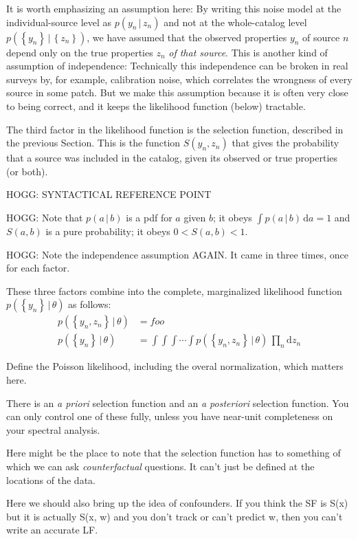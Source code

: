 \documentclass[modern]{aastex62}
\newcommand{\dd}{\mathrm{d}}
\newcommand{\given}{\,|\,}
\newcommand{\set}[1]{\left\{{#1}\right\}}
\newcommand{\sectionname}{Section}
\newcommand{\foreign}[1]{\textsl{#1}}
\begin{document}
It is worth emphasizing an assumption here:
By writing this noise model at the individual-source level as
$p(y_n\given z_n)$
and not at the whole-catalog level
$p(\set{y_n}\given\set{z_n})$,
we have assumed that the observed properties $y_n$ of source $n$
depend only on the true properties $z_n$ \emph{of that source}.
This is another kind of assumption of independence:
Technically this independence can be broken in real surveys by,
for example, calibration noise, which correlates the wrongness of
every source in some patch.
But we make this assumption because it is often very close to being
correct, and it keeps the likelihood function (below) tractable.

The third factor in the likelihood function is the selection function,
described in the previous \sectionname.
This is the function $S(y_n,z_n)$ that gives the probability that a source was included in the
catalog, given its observed or true properties (or both).

HOGG: SYNTACTICAL REFERENCE POINT

HOGG: Note that $p(a\given b)$ is a pdf for $a$ given $b$; it obeys
$\int p(a\given b)\,\dd a = 1$ and $S(a,b)$ is a pure probability; it
obeys $0<S(a, b)<1$.

HOGG: Note the independence assumption AGAIN. It came in three times, once
for each factor.

These three factors combine into the complete, marginalized likelihood
function $p(\set{y_n}\given\theta)$ as follows:
\begin{align}
p(\set{y_n, z_n}\given\theta) &= foo
\\
p(\set{y_n}\given\theta) &= \int\!\int\!\int\!\cdots\int p(\set{y_n, z_n}\given\theta)\,\prod_n\dd z_n
\end{align}

Define the Poisson likelihood, including the overal normalization, which matters here.

There is an \foreign{a priori} selection function and an \foreign{a posteriori}
selection function. You can only control one of these fully, unless you have near-unit
completeness on your spectral analysis.

Here might be the place to note that the selection function has to something of
which we can ask \emph{counterfactual} questions. It can't just be defined at
the locations of the data.

Here we should also bring up the idea of confounders. If you think the SF
is S(x) but it is actually S(x, w) and you don't track or can't predict w,
then you can't write an accurate LF.
\end{document}
